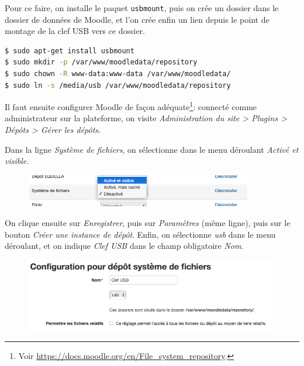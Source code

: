 \documentclass[11pt]{article}
\begin{document}
Pour ce faire, on installe le paquet \lstinline{usbmount}, puis on crée un dossier dans le dossier de données de Moodle, et l'on crée enfin un lien depuis le point de montage de la clef USB vers ce dossier.

\begin{lstlisting}[language=bash]
$ sudo apt-get install usbmount
$ sudo mkdir -p /var/www/moodledata/repository
$ sudo chown -R www-data:www-data /var/www/moodledata/
$ sudo ln -s /media/usb /var/www/moodledata/repository
\end{lstlisting}

Il faut ensuite configurer Moodle de façon adéquate\footnote{Voir \url{https://docs.moodle.org/en/File_system_repository}.}: connecté comme administrateur sur la plateforme, on visite \emph{Administration du site > Plugins > Dépôts > Gérer les dépôts}.

Dans la ligne \emph{Système de fichiers}, on sélectionne dans le menu déroulant \emph{Activé et visible}.

\begin{figure}[!ht]
\begin{minipage}[b]{\linewidth}
\centering
\includegraphics[width=10cm]{repo-filesystem-usb-1.png}
\end{minipage}
\end{figure}

On clique ensuite sur \emph{Enregistrer}, puis sur \emph{Paramètres} (même ligne), puis sur le bouton \emph{Créer une instance de dépôt}. Enfin, on sélectionne \emph{usb} dans le menu déroulant, et on indique \emph{Clef USB} dans le champ obligatoire \emph{Nom}.

\begin{figure}[!ht]
\begin{minipage}[b]{\linewidth}
\centering
\includegraphics[width=11cm]{repo-filesystem-usb-2.png}
\end{minipage}
\end{figure}
\end{document}
